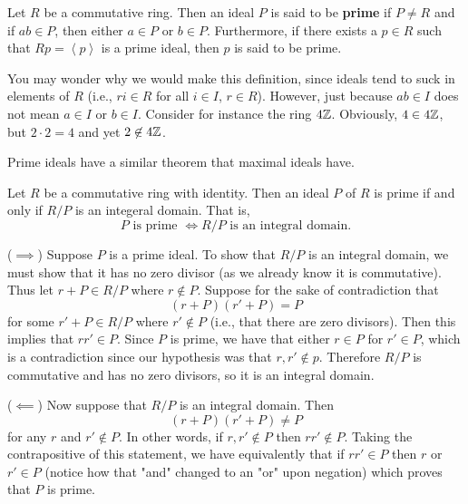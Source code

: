     \begin{definition}
        Let $R$ be a commutative ring. Then an ideal $P$ is said
        to be \textbf{prime} if $P \ne R$ and if $ab \in P$, then
        either $a \in P$ or $b \in P$. Furthermore, if there
        exists a $p \in R$ such that $Rp = \left< p \right>$ is a
        prime ideal, then $p$ is said to be prime.
    \end{definition}

    \textcolor{NavyBlue}{You may wonder why we would make this definition, since ideals tend to suck in elements of
    $R$ (i.e., $ri \in R$ for all $i \in I$, $r \in R$). However,
    just because $ab \in I$ does not mean $a \in I$ or $b \in I$. 
    Consider for instance the ring $4\mathbb{Z}$. Obviously, $4 \in
    4\mathbb{Z}$, but $2\cdot2 = 4$ and yet $2 \not\in 4\mathbb{Z}$.}

    Prime ideals have a similar theorem that maximal ideals have. 

    \begin{thm}\label{prime_theorem}
        Let $R$ be a commutative ring with identity. Then an ideal
        $P$ of $R$ is prime if and only if $R/P$ is an integeral
        domain. That is, 
        \[
            P \text{ is prime } \iff R/P \text{ is an integral domain.}
        \]
        \vspace{-0.8cm}
    \end{thm}

    \begin{prf}
        ($\implies$) Suppose $P$ is a prime ideal. To show that $R/P$ is an
        integral domain, we must show that it has no zero divisor
        (as we already know it is commutative). Thus 
        let $r + P \in R/P$ where $r \not\in P$.
        Suppose for the sake of contradiction that
        \[
            (r + P)(r' + P) = P   
        \]
        for some $r' + P \in R/P$ where $r' \not\in P$ (i.e.,
        that there are zero divisors). Then this
        implies that $rr' \in P$. Since $P$ is prime, we have that
        either $r \in P$ for $r' \in P$, which is a contradiction
        since our hypothesis was that $r, r' \not\in p$. Therefore
        $R/P$ is commutative and has no zero divisors, so it is an
        integral domain. 

        ($\impliedby$) Now suppose that $R/P$ is an integral
        domain. Then 
        \[
            (r + P)(r' + P) \ne P
        \]
        for any $r$ and $r' \not\in P$. In other words, if $r, r'
        \not\in P$ then $rr' \not\in P$. Taking the contrapositive of
        this statement, we have equivalently that if $rr' \in P$
        then $r$ or $r' \in P$ (notice how that "and" changed to
        an "or" upon negation) which proves that $P$ is prime.
    \end{prf}

